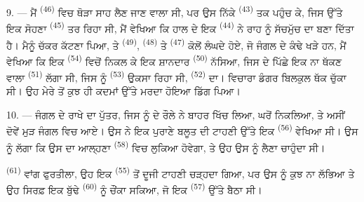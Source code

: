 9. --- ਮੈਂ  \textsuperscript{(46)} ਵਿਚ ਥੋੜਾ ਸਾਹ ਲੈਣ
ਜਾਣ ਵਾਲਾ ਸੀ, ਪਰ ਉਸ ਨਿੱਕੇ  \textsuperscript{(43)} ਤਕ ਪਹੁੰਚ ਕੇ, ਜਿਸ ਉੱਤੇ
ਇਕ ਸੋਹਣਾ  \textsuperscript{(45)} ਤਰ ਰਿਹਾ ਸੀ, ਮੈਂ ਵੇਖਿਆ ਕਿ ਹਾਲ ਦੇ ਇਕ
 \textsuperscript{(44)} ਨੇ ਰਾਹ ਨੂੰ ਸੱਚਮੁੱਚ ਦਾ  ਬਣਾ
ਦਿੱਤਾ ਹੈ। ਮੈਨੂੰ ਚੱਕਰ ਕੱਟਣਾ ਪਿਆ, ਤੇ  \textsuperscript{(49)},
 \textsuperscript{(48)} ਤੇ  \textsuperscript{(47)} ਕੋਲੋਂ
ਲੰਘਦੇ ਹੋਏ, ਜੋ ਜੰਗਲ ਦੇ ਕੰਢੇ ਖੜੇ ਹਨ, ਮੈਂ ਵੇਖਿਆ ਕਿ ਇਕ 
\textsuperscript{(54)} ਵਿਚੋਂ ਨਿਕਲ ਕੇ ਇਕ ਸ਼ਾਨਦਾਰ 
\textsuperscript{(50)} ਨੱਸਿਆ, ਜਿਸ ਦੇ ਪਿੱਛੇ ਇਕ ਨਾ ਥੱਕਣ ਵਾਲਾ
 \textsuperscript{(51)} ਲੱਗਾ ਸੀ, ਜਿਸ ਨੂੰ
 \textsuperscript{(53)} ਉਕਸਾ ਰਿਹਾ ਸੀ,
 \textsuperscript{(52)} ਦਾ। ਵਿਚਾਰਾ ਡੰਗਰ ਬਿਲਕੁਲ
ਥੱਕ ਚੁੱਕਾ ਸੀ। ਉਹ ਮੇਰੇ ਤੋਂ ਕੁਝ ਹੀ ਕਦਮਾਂ ਉੱਤੇ ਮਰਦਾ ਹੋਇਆ ਡਿੱਗ ਪਿਆ।

10. --- ਜੰਗਲ ਦੇ ਰਾਖੇ ਦਾ ਪੁੱਤਰ, ਜਿਸ ਨੂੰ  ਦੇ ਰੌਲੇ ਨੇ ਬਾਹਰ ਖਿੱਚ
ਲਿਆ, ਘਰੋਂ ਨਿਕਲਿਆ, ਤੇ ਅਸੀਂ ਦੋਵੇਂ ਮੁੜ ਜੰਗਲ ਵਿਚ ਆਏ। ਉਸ ਨੇ ਇਕ ਪੁਰਾਣੇ ਬਲੂਤ ਦੀ ਟਾਹਣੀ
ਉੱਤੇ ਇਕ  \textsuperscript{(56)} ਵੇਖਿਆ ਸੀ। ਉਸ ਨੂੰ ਲੱਗਾ ਕਿ ਉਸ ਦਾ ਆਲ੍ਹਣਾ
 \textsuperscript{(58)} ਵਿਚ ਲੁਕਿਆ ਹੋਵੇਗਾ, ਤੇ ਉਹ ਉਸ ਨੂੰ ਲੈਣਾ ਚਾਹੁੰਦਾ
ਸੀ।

 \textsuperscript{(61)} ਵਾਂਗ ਫੁਰਤੀਲਾ, ਉਹ ਇਕ 
\textsuperscript{(55)} ਤੋਂ ਦੂਜੀ ਟਾਹਣੀ ਚੜ੍ਹਦਾ ਗਿਆ, ਪਰ ਉਸ ਨੂੰ ਕੁਝ ਨਾ ਲੱਭਿਆ ਤੇ ਉਹ
ਸਿਰਫ਼ ਇਕ ਬੁੱਢੇ  \textsuperscript{(60)} ਨੂੰ ਚੌਂਕਾ ਸਕਿਆ, ਜੋ ਇਕ
 \textsuperscript{(57)} ਉੱਤੇ ਬੈਠਾ ਸੀ।
\VUsaut{4.0mm}
\VUfilet{22mm}
